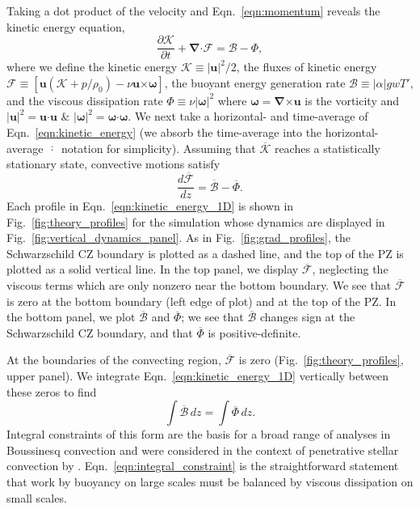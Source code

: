 \documentclass[twocolumn]{aastex631}
\renewcommand{\vec}[1]{\boldsymbol{#1}}
\renewcommand{\dot}{\vec{\cdot}}
\renewcommand{\bar}[1]{\overline{#1}}
\newcommand{\grad}{\vec{\nabla}}
\newcommand{\cross}{\vec{\times}}
\begin{document}
Taking a dot product of the velocity and Eqn.~\ref{eqn:momentum} reveals the kinetic energy equation,
\begin{equation}
\frac{\partial \mathcal{K}}{\partial t}
+ \grad\dot\mathcal{F}
= \mathcal{B} - \Phi,
\label{eqn:kinetic_energy}
\end{equation}
where we define the kinetic energy $\mathcal{K} \equiv |\vec{u}|^2/2$, the fluxes of kinetic energy $\mathcal{F} \equiv \left[\vec{u}(\mathcal{K} + p/\rho_0) - \nu\vec{u}\cross\vec{\omega} \right]$, the buoyant energy generation rate $\mathcal{B} \equiv |\alpha| g w T'$, and the viscous dissipation rate $\Phi \equiv \nu |\vec{\omega}|^2$ where $\vec{\omega} = \grad\cross\vec{u}$ is the vorticity and $|\vec{u}|^2 = \vec{u}\dot\vec{u}$ \& $|\vec{\omega}|^2 = \vec{\omega}\dot\vec{\omega}$.
We next take a horizontal- and time-average of Eqn.~\ref{eqn:kinetic_energy} (we absorb the time-average into the horizontal-average $\bar{\,\cdot\,}$ notation for simplicity).
Assuming that $\bar{\mathcal{K}}$ reaches a statistically stationary state, convective motions satisfy
\begin{equation}
\frac{d\bar{\mathcal{F}}}{dz} = \bar{\mathcal{B}} - \bar{\Phi}.
\label{eqn:kinetic_energy_1D}
\end{equation}
Each profile in Eqn.~\ref{eqn:kinetic_energy_1D} is shown in Fig.~\ref{fig:theory_profiles} for the simulation whose dynamics are displayed in Fig.~\ref{fig:vertical_dynamics_panel}.
As in Fig.~\ref{fig:grad_profiles}, the Schwarzschild CZ boundary is plotted as a dashed line, and the top of the PZ is plotted as a solid vertical line.
In the top panel, we display $\bar{\mathcal{F}}$, neglecting the viscous terms which are only nonzero near the bottom boundary.
We see that $\bar{\mathcal{F}}$ is zero at the bottom boundary (left edge of plot) and at the top of the PZ.
In the bottom panel, we plot $\bar{\mathcal{B}}$ and $\bar{\Phi}$; we see that $\bar{\mathcal{B}}$ changes sign at the Schwarzschild CZ boundary, and that $\bar{\Phi}$ is positive-definite.

At the boundaries of the convecting region, $\bar{\mathcal{F}}$ is zero (Fig.~\ref{fig:theory_profiles}, upper panel).
We integrate Eqn.~\ref{eqn:kinetic_energy_1D} vertically between these zeros to find
\begin{equation}
\int \bar{\mathcal{B}}\,dz = \int \bar{\Phi}\,dz.
\label{eqn:integral_constraint}
\end{equation}
Integral constraints of this form are the basis for a broad range of analyses in Boussinesq convection \citep[see e.g.,][]{ahlers_etal_2009, goluskin2016} and were considered in the context of penetrative stellar convection by \citet{roxburgh1989}.
Eqn.~\ref{eqn:integral_constraint} is the straightforward statement that work by buoyancy on large scales must be balanced by viscous dissipation on small scales.
\end{document}
